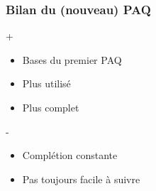 \begin{frame}
\frametitle{Bilan du (nouveau) PAQ}

\begin{block}{+}
\begin{itemize}
	\item Bases du premier PAQ %
	\item Plus utilisé %
	\item Plus complet %
\end{itemize}
\end{block} %

\begin{block}{-}
\begin{itemize}
	\item Complétion constante %
	\item Pas toujours facile à suivre %
\end{itemize}
\end{block} %

\end{frame} %



